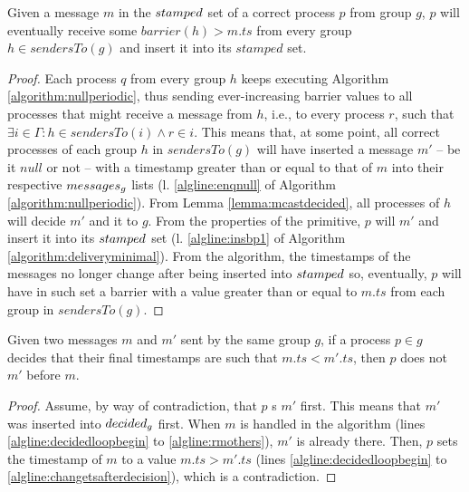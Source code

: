 \documentclass[times, 10pt]{article}
\begin{document}
\begin{lems} \label{lemma:barrierperiodic}
  Given a message $m$ in the $stamped$ set of a correct process $p$ from group $g$, $p$ will eventually receive some $barrier(h) > m.ts$ from every group $h \in sendersTo(g)$ and insert it into its $stamped$ set.
\end{lems}

\begin{proof}Each process $q$ from every group $h$ keeps executing Algorithm \ref{algorithm:nullperiodic}, thus sending ever-increasing barrier values to all processes that might receive a message from $h$, i.e., to every process $r$, such that $\exists i \in \Gamma: h \in sendersTo(i) \wedge r \in i$. %
This means that, at some point, all correct processes of each group $h$ in $sendersTo(g)$ will have inserted a message $m'$ -- be it $null$ or not -- with a timestamp greater than or equal to that of $m$ into their respective $messages\text{$_g$}$ lists (l. \ref{algline:enqnull} of Algorithm \ref{algorithm:nullperiodic}). From Lemma \ref{lemma:mcastdecided}, all processes of $h$ will decide $m'$ and \rmcast{} it to $g$. From the properties of the \rmcast{} primitive, $p$ will \rmdel{} $m'$ and insert it into its $stamped$ set (l. \ref{algline:insbp1} of Algorithm \ref{algorithm:deliveryminimal}). From the algorithm, the timestamps of the messages no longer change after being inserted into $stamped$ so, eventually, $p$ will have in such set a barrier with a value greater than or equal to $m.ts$ from each group in $sendersTo(g)$.\end{proof}







\begin{lems} \label{lemma:lowertsfrmcastfirst}
Given two messages $m$ and $m'$ sent by the same group $g$, if a process $p \in g$ decides that their final timestamps are such that $m.ts < m'.ts$, then $p$ does not \rmcast{} $m'$ before $m$.
\end{lems}

\begin{proof}
Assume, by way of contradiction, that $p$ \rmcast{}s $m'$ first. This means that $m'$ was inserted into $decided\text{$_g$}$ first. When $m$ is handled in the algorithm (lines \ref{algline:decidedloopbegin} to \ref{algline:rmothers}), $m'$ is already there. Then, $p$ sets the timestamp of $m$ to a value $m.ts > m'.ts$ (lines \ref{algline:decidedloopbegin} to \ref{algline:changetsafterdecision}), which is a contradiction.
\end{proof}
\end{document}
